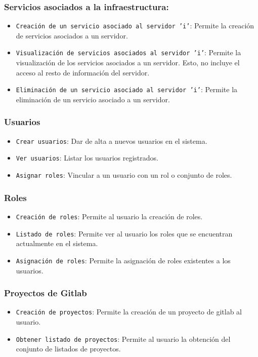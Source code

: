 \subsubsection{Servicios asociados a la infraestructura:}
\begin{itemize}
  \item \texttt{Creación de un servicio asociado al servidor 'i'}: Permite la creación de servicios asociados a un servidor. 
  \item \texttt{Visualización de servicios asociados al servidor 'i'}: Permite la visualización de los servicios asociados a un servidor. Esto, no incluye el acceso al resto de información del servidor. 
  \item \texttt{Eliminación de un servicio asociado al servidor 'i'}: Permite la eliminación de un servicio asociado a un servidor. 
\end{itemize}
\subsubsection{Usuarios}
\begin{itemize}
  \item \texttt{Crear usuarios}: Dar de alta a nuevos usuarios en el sistema. 
  \item \texttt{Ver usuarios}: Listar los usuarios registrados.
  \item \texttt{Asignar roles}: Vincular a un usuario con un rol o conjunto de roles.
\end{itemize}
\subsubsection{Roles}
\begin{itemize}
  \item \texttt{Creación de roles}: Permite al usuario la creación de roles.
  \item \texttt{Listado de roles}: Permite ver al usuario los roles que se encuentran actualmente en el sistema.
  \item \texttt{Asignación de roles}: Permite la asignación de roles existentes a los usuarios.
\end{itemize}

\subsubsection{Proyectos de Gitlab}
\begin{itemize}
  \item \texttt{Creación de proyectos}: Permite la creación de un proyecto de gitlab al usuario.
  \item \texttt{Obtener listado de proyectos}: Permite al usuario la obtención del conjunto de listados de proyectos.
\end{itemize}

